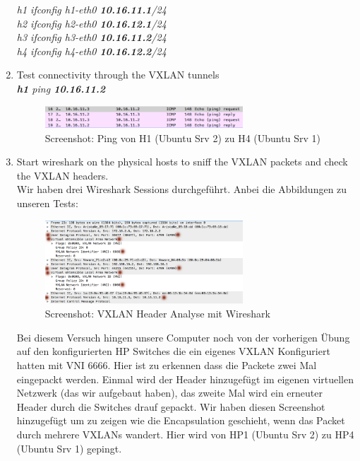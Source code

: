 \documentclass[a4,12pt]{scrartcl}
\begin{document}
\begin{enumerate}
\textit{h1 ifconfig h1-eth0 \textbf{10.16.11.1}/24}\\
\textit{h2 ifconfig h2-eth0 \textbf{10.16.12.1}/24}\\
\textit{h3 ifconfig h3-eth0 \textbf{10.16.11.2}/24}\\
\textit{h4 ifconfig h4-eth0 \textbf{10.16.12.2}/24}
\item Test connectivity through the VXLAN tunnels\\
\textit{\textbf{h1} ping \textbf{10.16.11.2}}
\begin{figure} [H]
	\begin{center}
	\includegraphics[width=0.70\textwidth]{./pictures/vxlan_pingtest.png}
	\caption{Screenshot: Ping von H1 (Ubuntu Srv 2) zu H4 (Ubuntu Srv 1)}
	\label{x}
	\end{center}
\end{figure}
\item Start wireshark on the physical hosts to sniff the VXLAN packets and check the VXLAN headers.\\
Wir haben drei Wireshark Sessions durchgeführt. Anbei die Abbildungen zu unseren Tests: 
\begin{figure} [H]
	\begin{center}
	\includegraphics[width=0.70\textwidth]{./pictures/vxlan_sniff.png}
	\caption{Screenshot: VXLAN Header Analyse mit Wireshark}
	\label{x}
	\end{center}
\end{figure}
Bei diesem Versuch hingen unsere Computer noch von der vorherigen Übung auf den konfigurierten HP Switches die ein eigenes VXLAN Konfiguriert hatten mit VNI 6666. Hier ist zu erkennen dass die Packete zwei Mal eingepackt werden. Einmal wird der Header hinzugefügt im eigenen virtuellen Netzwerk (das wir aufgebaut haben), das zweite Mal wird ein erneuter Header durch die Switches drauf gepackt. Wir haben diesen Screenshot hinzugefügt um zu zeigen wie die Encapsulation geschieht, wenn das Packet durch mehrere VXLANs wandert. Hier wird von HP1 (Ubuntu Srv 2) zu HP4 (Ubuntu Srv 1) gepingt. 

\end{enumerate}
\end{document}
